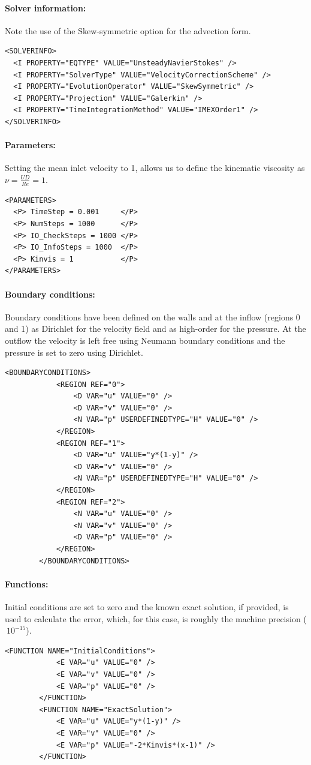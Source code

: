 \paragraph{Solver information:~} Note the use of the Skew-symmetric option for the advection form.
\begin{lstlisting}[style=XMLStyle]
<SOLVERINFO>
  <I PROPERTY="EQTYPE" VALUE="UnsteadyNavierStokes" />
  <I PROPERTY="SolverType" VALUE="VelocityCorrectionScheme" />
  <I PROPERTY="EvolutionOperator" VALUE="SkewSymmetric" />
  <I PROPERTY="Projection" VALUE="Galerkin" />
  <I PROPERTY="TimeIntegrationMethod" VALUE="IMEXOrder1" />
</SOLVERINFO>
\end{lstlisting}

\paragraph{Parameters:~} Setting the mean inlet velocity to 1, allows us to define the kinematic viscosity as $\nu = \frac{UD}{Re}=1$.
\begin{lstlisting}[style=XMLStyle]
<PARAMETERS>
  <P> TimeStep = 0.001     </P>
  <P> NumSteps = 1000      </P>
  <P> IO_CheckSteps = 1000 </P>
  <P> IO_InfoSteps = 1000  </P>
  <P> Kinvis = 1           </P>
</PARAMETERS>
\end{lstlisting}

\paragraph{Boundary conditions:~} Boundary conditions have been defined on the walls and at the inflow (regions 0 and 1) as Dirichlet for the velocity field and as high-order for the pressure. At the outflow the velocity is left free using Neumann boundary conditions and the pressure is set to zero using Dirichlet.
\begin{lstlisting}[style=XMLStyle]
        <BOUNDARYCONDITIONS>
   			<REGION REF="0">
     			<D VAR="u" VALUE="0" />
     			<D VAR="v" VALUE="0" />
     			<N VAR="p" USERDEFINEDTYPE="H" VALUE="0" />
   			</REGION>
   			<REGION REF="1">
     			<D VAR="u" VALUE="y*(1-y)" />
     			<D VAR="v" VALUE="0" />
     			<N VAR="p" USERDEFINEDTYPE="H" VALUE="0" />
   			</REGION>
   			<REGION REF="2">
     			<N VAR="u" VALUE="0" />
     			<N VAR="v" VALUE="0" />
     			<D VAR="p" VALUE="0" />
   			</REGION>
		</BOUNDARYCONDITIONS>
\end{lstlisting}

\paragraph{Functions:~} Initial conditions are set to zero and the known exact solution, if provided, is used to calculate the error, which, for this case, is roughly the machine precision ($~10^{-15}$).
\begin{lstlisting}[style=XMLStyle]
		<FUNCTION NAME="InitialConditions">
  			<E VAR="u" VALUE="0" />
  			<E VAR="v" VALUE="0" />
  			<E VAR="p" VALUE="0" />
		</FUNCTION>
		<FUNCTION NAME="ExactSolution">
  			<E VAR="u" VALUE="y*(1-y)" />
  			<E VAR="v" VALUE="0" />
  			<E VAR="p" VALUE="-2*Kinvis*(x-1)" />
		</FUNCTION>
\end{lstlisting}

